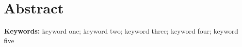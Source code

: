 \chapter{Abstract}
\thispagestyle{empty}

\noindent
\lipsum[1]
\noindent
\lipsum[2]
\noindent
\lipsum[3]
\noindent
\lipsum[4]
\noindent
\lipsum[5]

\vspace{1cm}
\noindent
\textbf{Keywords:} keyword one; keyword two; keyword three; keyword four; keyword five